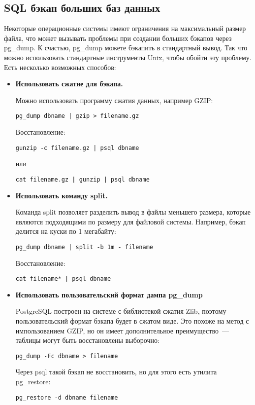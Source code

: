 \subsection{SQL бэкап больших баз данных}
Некоторые операционные системы имеют ограничения на максимальный размер файла, что может вызывать проблемы при создании 
больших бэкапов через pg\_dump. К счастью, pg\_dump можете бэкапить в стандартный вывод. Так что можно использовать 
стандартные инструменты Unix, чтобы обойти эту проблему. Есть несколько возможных способов:
\begin{itemize}
\item \textbf{Использовать сжатие для бэкапа.} 

Можно использовать программу сжатия данных, например GZIP:
\begin{lstlisting}[label=lst:backups7,caption=Сжатие бэкапа PostgreSQL]
pg_dump dbname | gzip > filename.gz
\end{lstlisting}

Восстановление:
\begin{lstlisting}[label=lst:backups8,caption=Восстановление бэкапа PostgreSQL]
gunzip -c filename.gz | psql dbname
\end{lstlisting}
или
\begin{lstlisting}[label=lst:backups9,caption=Восстановление бэкапа PostgreSQL]
cat filename.gz | gunzip | psql dbname
\end{lstlisting}

\item \textbf{Использовать команду split.} 

Команда split позволяет разделить вывод в файлы меньшего размера, которые являются подходящими по размеру для файловой системы. 
Например, бэкап делится на куски по 1 мегабайту:
\begin{lstlisting}[label=lst:backups10,caption=Создание бэкапа PostgreSQL]
pg_dump dbname | split -b 1m - filename
\end{lstlisting}
Восстановление:
\begin{lstlisting}[label=lst:backups11,caption=Восстановление бэкапа PostgreSQL]
cat filename* | psql dbname
\end{lstlisting}

\item \textbf{Использовать пользовательский формат дампа pg\_dump}

PostgreSQL построен на системе с библиотекой сжатия Zlib, поэтому пользовательский формат бэкапа будет в сжатом виде. 
Это похоже на метод с импользованием GZIP, но он имеет дополнительное преимущество~--- таблицы могут быть восстановлены выборочно:
\begin{lstlisting}[label=lst:backups12,caption=Создание бэкапа PostgreSQL]
pg_dump -Fc dbname > filename
\end{lstlisting}
Через psql такой бэкап не восстановить, но для этого есть утилита pg\_restore:
\begin{lstlisting}[label=lst:backups13,caption=Восстановление бэкапа PostgreSQL]
pg_restore -d dbname filename
\end{lstlisting}

\end{itemize}

